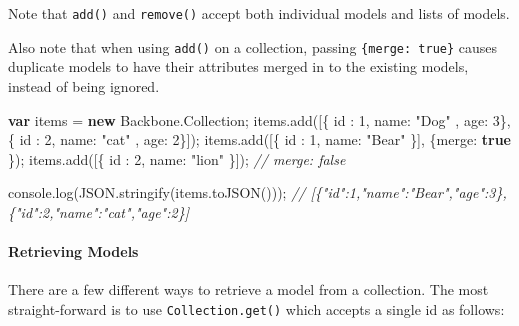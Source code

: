 \documentclass[9pt]{book}
\newenvironment{Shaded}{}{}
\newcommand{\KeywordTok}[1]{\textcolor[rgb]{0.00,0.44,0.13}{\textbf{{#1}}}}
\newcommand{\DataTypeTok}[1]{\textcolor[rgb]{0.56,0.13,0.00}{{#1}}}
\newcommand{\DecValTok}[1]{\textcolor[rgb]{0.25,0.63,0.44}{{#1}}}
\newcommand{\StringTok}[1]{\textcolor[rgb]{0.25,0.44,0.63}{{#1}}}
\newcommand{\CommentTok}[1]{\textcolor[rgb]{0.38,0.63,0.69}{\textit{{#1}}}}
\newcommand{\OtherTok}[1]{\textcolor[rgb]{0.00,0.44,0.13}{{#1}}}
\newcommand{\FunctionTok}[1]{\textcolor[rgb]{0.02,0.16,0.49}{{#1}}}
\newcommand{\NormalTok}[1]{{#1}}
\begin{document}
Note that \texttt{add()} and \texttt{remove()} accept both individual
models and lists of models.

Also note that when using \texttt{add()} on a collection, passing
\texttt{\{merge: true\}} causes duplicate models to have their
attributes merged in to the existing models, instead of being ignored.

\begin{Shaded}
\begin{Highlighting}[]
\KeywordTok{var} \NormalTok{items = }\KeywordTok{new} \OtherTok{Backbone}\NormalTok{.}\FunctionTok{Collection}\NormalTok{;}
\OtherTok{items}\NormalTok{.}\FunctionTok{add}\NormalTok{([\{ }\DataTypeTok{id }\NormalTok{: }\DecValTok{1}\NormalTok{, }\DataTypeTok{name}\NormalTok{: }\StringTok{"Dog"} \NormalTok{, }\DataTypeTok{age}\NormalTok{: }\DecValTok{3}\NormalTok{\}, \{ }\DataTypeTok{id }\NormalTok{: }\DecValTok{2}\NormalTok{, }\DataTypeTok{name}\NormalTok{: }\StringTok{"cat"} \NormalTok{, }\DataTypeTok{age}\NormalTok{: }\DecValTok{2}\NormalTok{\}]);}
\OtherTok{items}\NormalTok{.}\FunctionTok{add}\NormalTok{([\{ }\DataTypeTok{id }\NormalTok{: }\DecValTok{1}\NormalTok{, }\DataTypeTok{name}\NormalTok{: }\StringTok{"Bear"} \NormalTok{\}], \{}\DataTypeTok{merge}\NormalTok{: }\KeywordTok{true} \NormalTok{\});}
\OtherTok{items}\NormalTok{.}\FunctionTok{add}\NormalTok{([\{ }\DataTypeTok{id }\NormalTok{: }\DecValTok{2}\NormalTok{, }\DataTypeTok{name}\NormalTok{: }\StringTok{"lion"} \NormalTok{\}]); }\CommentTok{// merge: false}
 
\OtherTok{console}\NormalTok{.}\FunctionTok{log}\NormalTok{(}\OtherTok{JSON}\NormalTok{.}\FunctionTok{stringify}\NormalTok{(}\OtherTok{items}\NormalTok{.}\FunctionTok{toJSON}\NormalTok{()));}
\CommentTok{// [\{"id":1,"name":"Bear","age":3\},\{"id":2,"name":"cat","age":2\}]}
\end{Highlighting}
\end{Shaded}

\paragraph{Retrieving Models}\label{retrieving-models}

There are a few different ways to retrieve a model from a collection.
The most straight-forward is to use \texttt{Collection.get()} which
accepts a single id as follows:
\end{document}
